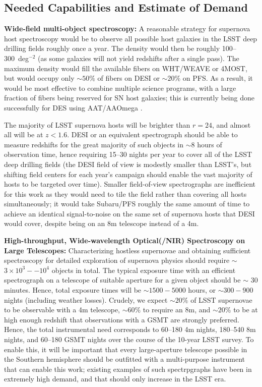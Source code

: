 \subsection{Needed Capabilities and Estimate of Demand}

{\bf Wide-field multi-object spectroscopy:}  A reasonable strategy for supernova host spectroscopy would be to observe all possible host galaxies in the LSST deep drilling fields 
roughly once a year.  The density would then be roughly
100--300~deg$^{-2}$ (as some galaxies will not yield redshifts after a
single pass).  The maximum density would fill the available fibers on WHT/WEAVE or 4MOST, but would occupy only $\sim 50\%$ of fibers on DESI or $\sim 20\%$ on PFS.    As a result, it would be most effective to combine multiple science programs, with a large fraction of fibers being reserved for SN host galaxies; this is
currently being done successfully for DES using AAT/AAOmega
\citep{Yuan15}.

The majority of LSST supernova hosts will be brighter than $r=24$, and almost all will be at $z<1.6$.  DESI or an equivalent spectrograph should be able to measure redshifts for the great majority of such objects in $\sim 8$ hours of observation time, hence requiring 15--30 nights per year to cover all of the LSST deep drilling fields (the DESI field of view is modestly smaller than LSST's, but shifting field centers for each year's campaign should enable the vast majority of hosts to be targeted over time).  Smaller field-of-view spectrographs are inefficient for this work as they would need to tile the field rather than covering all hosts simultaneously; it would take Subaru/PFS roughly the same amount of time to achieve an identical signal-to-noise on the same set of supernova hosts that DESI would cover, despite being on an 8m telescope instead of a 4m.  

{\bf High-throughput, Wide-wavelength Optical(/NIR) Spectroscopy on Large Telescopes:}  Characterizing hostless supernovae and obtaining sufficient spectroscopy for detailed exploration of supernova physics should require $\sim$ $3\times10^3 -- 10^4$ objects in total.  The typical exposure time with an efficient spectrograph on a telescope of suitable aperture for a given object should be $\sim$ 30 minutes.  Hence, total exposure times will be $\sim 1500-5000$ hours, or $\sim 300-900$ nights (including weather losses).  Crudely, we expect $\sim 20\%$ of LSST supernovae to be observable with a 4m telescope, $\sim 60\%$ to require an 8m, and $\sim 20\%$ to be at high enough redshift that observations with a GSMT are strongly preferred.  Hence, the total instrumental need corresponds to 60--180 4m nights, 180--540 8m nights, and 60--180 GSMT nights over the course of the 10-year LSST survey.  To enable this, it will be important that every large-aperture telescope possible in the Southern hemisphere should be outfitted with a multi-purpose instrument that can enable this work; existing examples of such spectrpgraphs have been in extremely high demand, and that should only increase in the LSST era.

